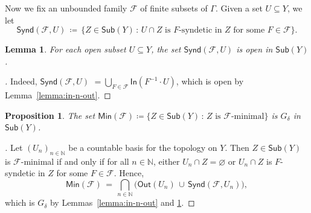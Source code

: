\documentclass[11pt,reqno,psamsfonts]{amsart}
\theoremstyle{bfnote}
\newtheorem{prop}[theo]{Proposition}
\newtheorem{lemma}[theo]{Lemma}
\theoremstyle{definition}
\theoremstyle{remark}
\newcommand{\0}{\varnothing}
\newcommand{\set}[1]{\{#1\}}
\newcommand{\defeq}{\coloneqq}
\newcommand{\G}{\Gamma}
\newcommand{\N}{\mathbb{N}}
\newcommand{\Sub}{\mathsf{Sub}}
\newcommand{\In}{\mathsf{In}}
\newcommand{\Out}{\mathsf{Out}}
\newcommand{\Synd}{\mathsf{Synd}}
\newcommand{\Min}{\mathsf{Min}}
\numberwithin{equation}{section}
\newenvironment{scproof}[1][]{\begin{proof}[\textsc{\upshape{Proof}}#1]}{\end{proof}}
\begin{document}
    Now we fix an unbounded family $\mathcal{F}$ of finite subsets of $\G$. Given a set $U \subseteq Y$, %
    we let
    \[
        \Synd(\mathcal{F},U) \,\defeq\, \set{Z \in \Sub(Y) \,:\, \text{$U \cap Z$ is $F$-syndetic in $Z$ for some $F \in \mathcal{F}$}}.
    \]

    \begin{lemma}\label{lemma:SU}
        For each open subset $U \subseteq Y$, %
        the set $\Synd(\mathcal{F},U)$ is open in $\Sub(Y)$.
    \end{lemma}
    \begin{scproof}
        Indeed, ${\Synd}(\mathcal{F},U)$ $= \bigcup_{F \in \mathcal{F}} \In(F^{-1} \cdot U)$, which is open by Lemma~\ref{lemma:in-n-out}. %
    \end{scproof}


    \begin{prop}\label{prop:Gdelta}
        The set $\Min(\mathcal{F}) \defeq \set{Z \in \Sub(Y) \,:\, \text{$Z$ is $\mathcal{F}$-minimal}}$ is $G_\delta$ in $\Sub(Y)$.
    \end{prop}
    \begin{scproof}
        Let $(U_n)_{n \in \N}$ be a countable basis for the topology on $Y$. Then $Z \in \Sub(Y)$ is $\mathcal{F}$-minimal if and only if for all $n \in \N$, either $U_n \cap Z = \0$ or $U_n \cap Z$ is $F$-syndetic in $Z$ for some $F \in \mathcal{F}$. Hence,
        \begin{equation}\label{eq:min}
            \Min(\mathcal{F}) \,=\, \bigcap_{n \in \N} \big(\Out(U_n) \,\cup\, \Synd(\mathcal{F}, U_n)\big),
        \end{equation}
        which is $G_\delta$ by Lemmas~\ref{lemma:in-n-out} and \ref{lemma:SU}.
    \end{scproof}
\end{document}
